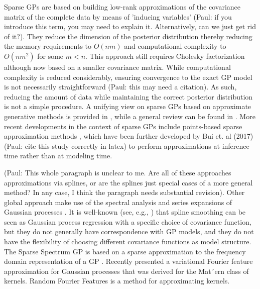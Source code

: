 \documentclass[]{interact}
\theoremstyle{plain}%
\theoremstyle{definition}
\theoremstyle{remark}
\begin{document}
Sparse GPs are based on building low-rank approximations of the covariance matrix of the complete data by means of 'inducing variables' (Paul: if you introduce this term, you may need to explain it. Alternatively, can we just get rid of it?). They reduce the dimension of the posterior distribution thereby reducing the memory requirements to $O(nm)$ and computational complexity to $O(nm^2)$ for some $m < n$. This approach still requires Cholesky factorization although now based on a smaller covariance matrix. While computational complexity is reduced considerably, ensuring convergence to the exact GP model is not necessarily straightforward (Paul: this may need a citation). As such, reducing the amount of data while maintaining the correct posterior distribution is not a simple procedure. A unifying view on sparse GPs based on approximate generative methods is provided in \cite{quinonero2005unifying}, while a general review can be found in \cite{rasmussen2006gaussian}. More recent developments in the context of sparse GPs include points-based sparse approximation methods \citep{wilson2015kernel}, which have been further developed by Bui et. al (2017) (Paul: cite this study correctly in latex) to perform approximations at inference time rather than at modeling time.

(Paul: This whole paragraph is unclear to me. Are all of these approaches approximations via splines, or are the splines just special cases of a more general method? In any case, I think the paragraph needs substantial revision). Other global approach make use of the spectral analysis and series expansions of Gaussian processes \citep{loeve1977probability,trees1968detection,adler1981geometry,cramer2013stationary}. It is well-known (see, e.g., \cite{wahba1990spline}) that spline smoothing can be seen as Gaussian process regression with a specific choice of covariance function, but they do not generally have correspondence with GP models, and they do not have the flexibility of choosing different covariance functions as model structure. The Sparse Spectrum GP is based on a sparse approximation to the frequency domain representation of a GP \citep{lazaro2010sparse,quia2010sparse,gal2015improving,gal2015improving}. Recently \citep{hensman2017variational} presented a variational Fourier feature approximation for Gaussian processes that was derived for the Mat´ern class of kernels. Random Fourier Features \citep{rahimi2008random,rahimi2009weighted} is a method for approximating kernels.
\end{document}
